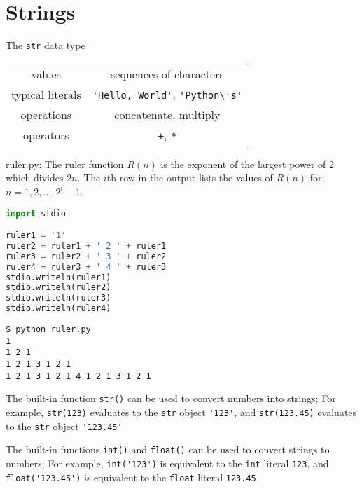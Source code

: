 \documentclass[8pt,a4paper,compress]{beamer}
\begin{document}
\section{Strings}
\begin{frame}[fragile]
The \lstinline{str} data type

\begin{center}
\begin{tabular}{c|c}
values & sequences of characters \\ 
typical literals & \lstinline$'Hello, World'$, \lstinline$'Python\'s'$ \\ 
operations & concatenate, multiply \\
operators & \lstinline$+$, \lstinline$*$
\end{tabular} 
\end{center}

\begin{framed}
\tiny ruler.py: The ruler function $R(n)$ is the exponent of the largest power of 2 which 
divides $2n$. The $i$th row in the output lists the values of $R(n)$ for $n=1,2,
\dots,2^i-1$.
\end{framed}

\begin{lstlisting}[language=Python]
import stdio

ruler1 = '1'
ruler2 = ruler1 + ' 2 ' + ruler1
ruler3 = ruler2 + ' 3 ' + ruler2
ruler4 = ruler3 + ' 4 ' + ruler3
stdio.writeln(ruler1)
stdio.writeln(ruler2)
stdio.writeln(ruler3)
stdio.writeln(ruler4)
\end{lstlisting}

\begin{lstlisting}[language={}]
$ python ruler.py 
1
1 2 1
1 2 1 3 1 2 1
1 2 1 3 1 2 1 4 1 2 1 3 1 2 1
\end{lstlisting}
\end{frame}

\begin{frame}[fragile]
The built-in function \lstinline{str()} can be used to convert numbers into strings; For example, \lstinline{str(123)} evaluates to the \lstinline{str} object \lstinline{'123'}, and \lstinline{str(123.45)} evaluates to the \lstinline{str} object \lstinline{'123.45'}

\bigskip

The built-in functions \lstinline{int()} and \lstinline{float()} can be used to convert strings to numbers; For example, \lstinline{int('123')} is equivalent to the \lstinline{int} literal \lstinline{123}, and \lstinline{float('123.45')} is equivalent to the \lstinline{float} literal \lstinline{123.45}
\end{frame}
\end{document}
